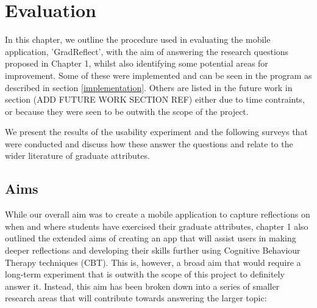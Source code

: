 \documentclass{l4proj}
\begin{document}




\chapter{Evaluation} \label{evaluation}

In this chapter, we outline the procedure used in evaluating the mobile application, 'GradReflect', 
with the aim of answering the research questions proposed in Chapter 1, whilst also identifying some 
potential areas for improvement. Some of these were implemented and can be seen in the program
as described in section \ref{implementation}. Others are listed in the future work in section (ADD FUTURE WORK SECTION REF)
either due to time contraints, or because they were seen to be outwith the scope of the project.
\par 
We present the results of the 
usability experiment and the following surveys that were conducted and discuss how these 
answer the questions and relate to the wider literature of graduate attributes. 

\section{Aims} \label{evalAims}

While our overall aim was to create a mobile application to capture reflections on when and where
students have exercised their graduate attributes, chapter 1 also outlined the extended aims of creating
an app that will assist users in making deeper reflections and developing their skills further using 
Cognitive Behaviour Therapy techniques (CBT). This is, however, a broad aim that would require a long-term 
experiment that is outwith the scope of this project to definitely answer it. Instead, this aim has been 
broken down into a series of smaller research areas that will contribute towards answering the larger topic:
\end{document}

